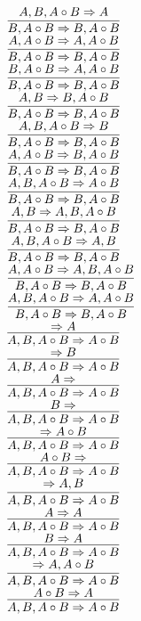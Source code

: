 \documentclass[11pt]{article}
\begin{document}
\begin{center}
\bigskip
\\$\infer{B, A\circ B\Rightarrow B, A\circ B}{A, B, A\circ B\Rightarrow A}$
\bigskip
\\$\infer{B, A\circ B\Rightarrow B, A\circ B}{A, A\circ B\Rightarrow A, A\circ B}$
\bigskip
\\$\infer{B, A\circ B\Rightarrow B, A\circ B}{B, A\circ B\Rightarrow A, A\circ B}$
\bigskip
\\$\infer{B, A\circ B\Rightarrow B, A\circ B}{A, B\Rightarrow B, A\circ B}$
\bigskip
\\$\infer{B, A\circ B\Rightarrow B, A\circ B}{A, B, A\circ B\Rightarrow B}$
\bigskip
\\$\infer{B, A\circ B\Rightarrow B, A\circ B}{A, A\circ B\Rightarrow B, A\circ B}$
\bigskip
\\$\infer{B, A\circ B\Rightarrow B, A\circ B}{A, B, A\circ B\Rightarrow A\circ B}$
\bigskip
\\$\infer{B, A\circ B\Rightarrow B, A\circ B}{A, B\Rightarrow A, B, A\circ B}$
\bigskip
\\$\infer{B, A\circ B\Rightarrow B, A\circ B}{A, B, A\circ B\Rightarrow A, B}$
\bigskip
\\$\infer{B, A\circ B\Rightarrow B, A\circ B}{A, A\circ B\Rightarrow A, B, A\circ B}$
\bigskip
\\$\infer{B, A\circ B\Rightarrow B, A\circ B}{A, B, A\circ B\Rightarrow A, A\circ B}$
\bigskip
\\$\infer{A, B, A\circ B\Rightarrow A\circ B}{\Rightarrow A}$
\bigskip
\\$\infer{A, B, A\circ B\Rightarrow A\circ B}{\Rightarrow B}$
\bigskip
\\$\infer{A, B, A\circ B\Rightarrow A\circ B}{A\Rightarrow }$
\bigskip
\\$\infer{A, B, A\circ B\Rightarrow A\circ B}{B\Rightarrow }$
\bigskip
\\$\infer{A, B, A\circ B\Rightarrow A\circ B}{\Rightarrow A\circ B}$
\bigskip
\\$\infer{A, B, A\circ B\Rightarrow A\circ B}{A\circ B\Rightarrow }$
\bigskip
\\$\infer{A, B, A\circ B\Rightarrow A\circ B}{\Rightarrow A, B}$
\bigskip
\\$\infer{A, B, A\circ B\Rightarrow A\circ B}{A\Rightarrow A}$
\bigskip
\\$\infer{A, B, A\circ B\Rightarrow A\circ B}{B\Rightarrow A}$
\bigskip
\\$\infer{A, B, A\circ B\Rightarrow A\circ B}{\Rightarrow A, A\circ B}$
\bigskip
\\$\infer{A, B, A\circ B\Rightarrow A\circ B}{A\circ B\Rightarrow A}$

\end{center}
\end{document}

